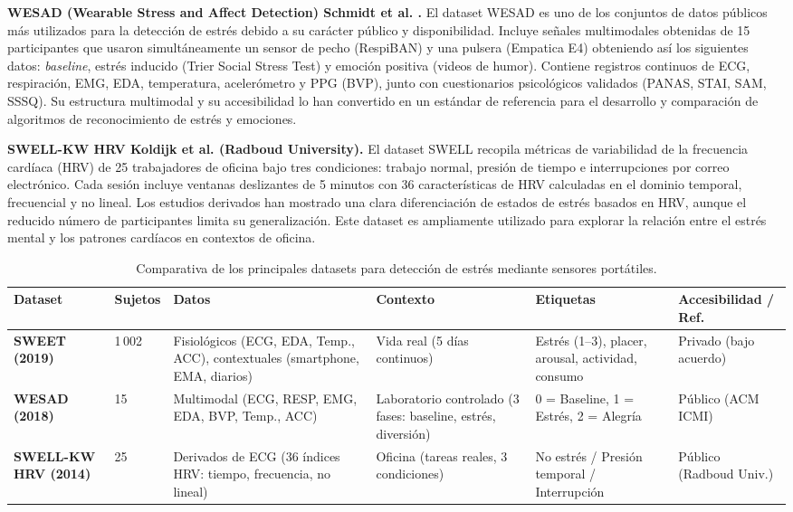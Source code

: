 \documentclass{report}
\begin{document}
\textbf{WESAD (Wearable Stress and Affect Detection) Schmidt et al. \cite{schmidt2018wesad}.}  
El dataset WESAD es uno de los conjuntos de datos públicos más utilizados para la detección de estrés debido a su carácter público y disponibilidad.  
Incluye señales multimodales obtenidas de 15 participantes que usaron simultáneamente un sensor de pecho (RespiBAN) y una pulsera (Empatica E4) obteniendo así los siguientes datos: \textit{baseline}, estrés inducido (Trier Social Stress Test) y emoción positiva (videos de humor).  
Contiene registros continuos de ECG, respiración, EMG, EDA, temperatura, acelerómetro y PPG (BVP), junto con cuestionarios psicológicos validados (PANAS, STAI, SAM, SSSQ).  
Su estructura multimodal y su accesibilidad lo han convertido en un estándar de referencia para el desarrollo y comparación de algoritmos de reconocimiento de estrés y emociones.

\textbf{SWELL-KW HRV Koldijk et al. (Radboud University).}\cite{Koldijk2016SWELL}
El dataset SWELL recopila métricas de variabilidad de la frecuencia cardíaca (HRV) de 25 trabajadores de oficina bajo tres condiciones: trabajo normal, presión de tiempo e interrupciones por correo electrónico.  
Cada sesión incluye ventanas deslizantes de 5 minutos con 36 características de HRV calculadas en el dominio temporal, frecuencial y no lineal.  
Los estudios derivados han mostrado una clara diferenciación de estados de estrés basados en HRV, aunque el reducido número de participantes limita su generalización.  
Este dataset es ampliamente utilizado para explorar la relación entre el estrés mental y los patrones cardíacos en contextos de oficina.

\begin{table}[H]
\centering
\caption{Comparativa de los principales datasets para detección de estrés mediante sensores portátiles.}
\label{tab:stress-datasets}
\renewcommand{\arraystretch}{1.25}
\begin{tabular}{p{} p{} p{3cm} p{1.5cm} p{} p{}}
\toprule
\textbf{Dataset} & \textbf{Sujetos} & \textbf{Datos} & \textbf{Contexto } & \textbf{Etiquetas} & \textbf{Accesibilidad / Ref.} \\
\midrule
\textbf{SWEET (2019)} & 1\,002 &
Fisiológicos (ECG, EDA, Temp., ACC), contextuales (smartphone, EMA, diarios) &
Vida real (5 días continuos) &
Estrés (1–3), placer, arousal, actividad, consumo &
Privado (bajo acuerdo) \cite{Smets2018DigitalPhenotypes} \\

\textbf{WESAD (2018)} & 15 &
Multimodal (ECG, RESP, EMG, EDA, BVP, Temp., ACC) &
Laboratorio controlado (3 fases: baseline, estrés, diversión) &
0 = Baseline, 1 = Estrés, 2 = Alegría &
Público (ACM ICMI) \cite{schmidt2018wesad} \\

\textbf{SWELL-KW HRV (2014)} & 25 &
Derivados de ECG (36 índices HRV: tiempo, frecuencia, no lineal) &
Oficina (tareas reales, 3 condiciones) &
No estrés / Presión temporal / Interrupción &
Público (Radboud Univ.)\cite{Koldijk2016SWELL} \\


\bottomrule
\end{tabular}
\end{table}
\end{document}
